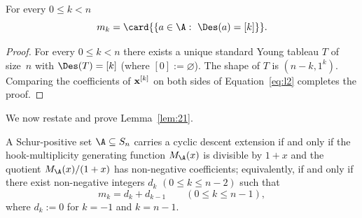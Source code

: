 \begin{observation}\label{lem:1}
    For every $0\le k <n$
    \[
        m_k = \card{\{a\in \A:\ \Des(a)=[k]\}}.
    \]
\end{observation}

\begin{proof}
    For every $0 \le k < n$ there exists 
    a unique standard Young tableau $T$ of size~$n$ with
    $\Des(T) = [k]$ (where $[0] := \varnothing$). 
    The shape of $T$ is $(n-k,1^k)$.
    Comparing the coefficients of ${\bf x}^{[k]}$ on both sides of Equation~\eqref{eq:l2} completes the proof.
\end{proof}

We now restate and prove Lemma~\ref{lem:21}.

\begin{lemma}\label{lem:2}
    A Schur-positive set $\A \subseteq S_n$ carries a cyclic descent extension if and only if 
    the hook-multiplicity generating function $M_\A(x)$ 
    is divisible by $1+x$
    and the quotient $M_\A(x)/(1+x)$ has non-negative coefficients; 
    equivalently, if and only if
    there exist non-negative integers $d_k$ $(0 \le k \le n-2)$ such that
    \[
        m_k = d_k + d_{k-1} \qquad (0 \le k \le n-1),
    \]
    where $d_k := 0$ for $k = -1$ and $k = n-1$.
\end{lemma}
	
